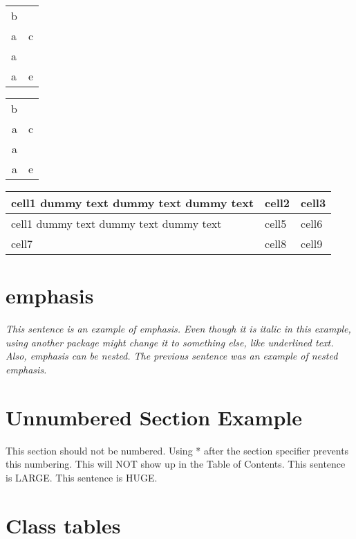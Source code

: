 \documentclass{article}
\begin{document}
\begin{tabular}{|l|l|}
\hline
b &   \\ \cline{1-1}
a & c \\
a &   \\ \cline{2-2} 
a & e \\ \hline
\end{tabular}

\begin{tabular}{|r|r|}
    \hline
    b &  \multirow{3}{*}{c} \\
    \cline{1-1}
    a &    \\
    a &    \\
    \cline{2-2}
    a & e  \\
    \hline
    
\end{tabular}



\begin{tabular}{ | p{15em} | p{1cm}| p{5cm} | } 
  \hline
  cell1 dummy text dummy text dummy text& cell2 & cell3 \\ 
  \hline
  cell1 dummy text dummy text dummy text & cell5 & cell6 \\ 
  \hline
  cell7 & cell8 & cell9 \\ 
  \hline
\end{tabular}



\section{emphasis}
\emph{This sentence is an example of emphasis. Even though it is italic in this example, using another package might change it to something else, like underlined text.  \emph{Also, emphasis can be nested.} The previous sentence was an example of nested emphasis.} 

\section*{Unnumbered Section Example}
This section should not be numbered. Using * after the section specifier prevents this numbering. This will NOT show up in the Table of Contents.
\LARGE{This sentence is LARGE.}
\Huge{This sentence is HUGE.}

\section{Class tables}
\end{document}
